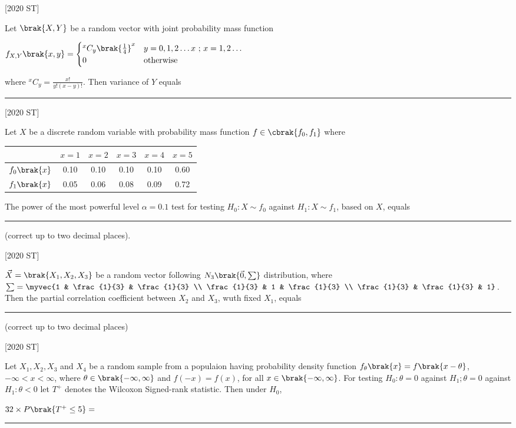     \hfill [2020 ST]
    \item Let $\brak{X,Y}$ be a random vector with joint probability mass function
    \begin{center}
        $f_{X,Y}\brak{x,y} = 
        \begin{cases}
            ^xC_y\brak{\frac{1}{4}}^x & y = 0,1,2 \ldots x\text{ ; } x = 1,2 \ldots \\
            0 & \text{otherwise}
        \end{cases}$
    \end{center}
    where $^xC_y = \frac{x!}{y!(x-y)!}$. Then variance of $Y$ equals \rule{2cm}{0.4pt}

    \hfill [2020 ST]
    \item Let $X$ be a discrete random variable with probability mass function $f \in \cbrak{f_0, f_1}$ where 
    \begin{table}[H]
        \centering
        \begin{tabular}{c|c c c c c}
\hline
     & $x = 1$ & $x = 2 $ & $x = 3$ & $x = 4 $ & $x = 5$\\
     \hline
    $f_0\brak{x}$ & 0.10 & 0.10 & 0.10 & 0.10 & 0.60 \\
    \hline
    $f_1\brak{x}$ & 0.05 & 0.06 & 0.08 & 0.09 & 0.72 \\
    \hline
\end{tabular}
    \end{table}
    The power of the most powerful level $\alpha = 0.1$ test for testing $H_0: X \sim f_0$ against $H_1 : X \sim f_1$, based on $X $, equals \rule{2cm}{0.4pt} (correct up to two decimal places).

    \hfill [2020 ST]
    \item $\vec{X} = \brak{X_1, X_2, X_3}$ be a random vector following $N_3 \brak{\vec{0}, \sum }$ distribution, where $\sum = \myvec{1 & \frac{1}{3} & \frac{1}{3} \\
    \frac{1}{3} & 1 & \frac{1}{3} \\ \frac{1}{3} & \frac{1}{3} & 1}$. Then the partial correlation coefficient between $X_2$ and $X_3$, wuth fixed $X_1$, equals \rule{2cm}{0.4pt} (correct up to two decimal places)

    \hfill [2020 ST]
    \item Let $X_1, X_2 ,X_3$ and $X_4$ be a random sample from a populaion having probability density function $f_{\theta}\brak{x} = f\brak{x - \theta}$, $-\infty < x < \infty$, where $\theta \in \brak{-\infty, \infty}$ and $f(-x) = f(x)$, for all $x \in \brak{- \infty, \infty}$. For testing $H_0 : \theta = 0$ against $H_1 ; \theta = 0$ against $H_1:\theta < 0$ let $T^{+}$ denotes the Wilcoxon Signed-rank statistic. Then under $H_0$,
    \begin{center}
        $32 \times P\brak{T^+ \leq 5} = $\rule{2cm}{0.4pt}
    \end{center}
    
